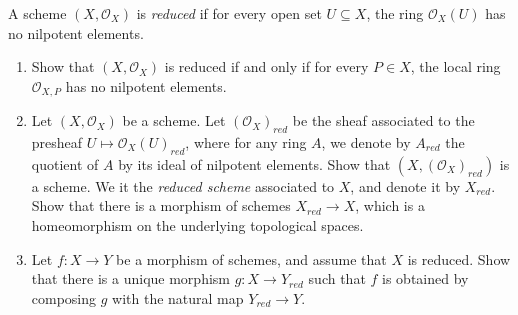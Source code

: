 \begin{exercise}
	A scheme $(X, \mathcal{O}_X) $ is \textit{reduced} if for every open set $U \subseteq X $, the ring $\mathcal{O}_X(U) $ has no nilpotent elements.
	\begin{enumerate}
		\item Show that $(X, \mathcal{O}_X) $ is reduced if and only if for every $P \in X$, the local ring $\mathcal{O}_{X,P} $ has no nilpotent elements.
		\item Let $(X, \mathcal{O}_X) $ be a scheme. Let $(\mathcal{O}_X)_{red} $ be the sheaf associated to the presheaf $U\mapsto \mathcal{O}_X(U)_{red} $, where for any ring $A $, we denote by $A_{red} $ the quotient of $A $ by its ideal of nilpotent elements. Show that $(X, (\mathcal{O}_X)_{red})$ is a scheme. We it the \textit{reduced scheme} associated to $X $, and denote it by $X_{red} $. Show that there is a morphism of schemes $X_{red}\to X $, which is a homeomorphism on the underlying topological spaces.
		\item Let $f: X\to Y $ be a morphism of schemes, and assume that $X $ is reduced. Show that there is a unique morphism $g: X\to Y_{red} $ such that $f $ is obtained by composing $g $ with the natural map $Y_{red}\to Y $.
	\end{enumerate}
\end{exercise}
